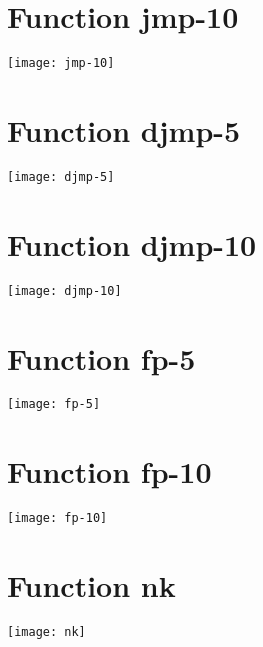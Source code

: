 \section{Function jmp-10}
\begin{center}

\end{center}
\begin{center}
\texttt{[image: jmp-10]}
\end{center}
\newpage
\section{Function djmp-5}
\begin{center}

\end{center}
\begin{center}
\texttt{[image: djmp-5]}
\end{center}
\newpage
\section{Function djmp-10}
\begin{center}

\end{center}
\begin{center}
\texttt{[image: djmp-10]}
\end{center}
\newpage
\section{Function fp-5}
\begin{center}

\end{center}
\begin{center}
\texttt{[image: fp-5]}
\end{center}
\newpage
\section{Function fp-10}
\begin{center}

\end{center}
\begin{center}
\texttt{[image: fp-10]}
\end{center}
\newpage
\section{Function nk}
\begin{center}

\end{center}
\begin{center}
\texttt{[image: nk]}
\end{center}
\newpage
